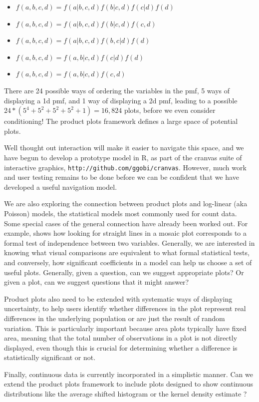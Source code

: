 \documentclass[journal]{vgtc}
\begin{document}
\begin{itemize}
  \setlength{\itemsep}{0em}
  
  \item $f(a, b, c, d) = f(a | b, c, d) f(b | c, d) f(c | d) f(d)$
  \item $f(a, b, c, d) = f(a | b, c, d) f(b | c, d) f(c, d)$
  \item $f(a, b, c, d) = f(a | b, c, d) f(b, c | d) f(d)$
  \item $f(a, b, c, d) = f(a, b | c, d) f(c | d) f(d)$
  \item $f(a, b, c, d) = f(a, b | c, d) f(c, d)$
\end{itemize}

\noindent There are 24 possible ways of ordering the variables in the {\sc pmf}, 5 ways of displaying a 1d {\sc pmf}, and 1 way of displaying a 2d {\sc pmf}, leading to a possible $24 * (5^4 + 5^2 + 5^2 + 5^2 + 1) = 16,824$ plots, before we even consider conditioning! The product plots framework defines a large space of potential plots.

Well thought out interaction will make it easier to navigate this space, and we have begun to develop a prototype model in R, as part of the cranvas suite of interactive graphics, {\tt http://github.com/ggobi/cranvas}.  However, much work and user testing remains to be done before we can be confident that we have developed a useful navigation model.

We are also exploring the connection between product plots and log-linear (aka Poisson) models, the statistical models most commonly used for count data. Some special cases of the general connection have already been worked out. For example, \citep{hofmann:2003} shows how looking for straight lines in a mosaic plot corresponds to a formal test of independence between two variables. Generally, we are interested in knowing what visual comparisons are equivalent to what formal statistical tests, and conversely, how significant coefficients in a model can help us choose a set of useful plots. Generally, given a question, can we suggest appropriate plots? Or given a plot, can we suggest questions that it might answer?

Product plots also need to be extended with systematic ways of displaying uncertainty, to help users identify whether differences in the plot represent real differences in the underlying population or are just the result of random variation. This is particularly important because area plots typically have fixed area, meaning that the total number of observations in a plot is not directly displayed, even though this is crucial for determining whether a difference is statistically significant or not.

Finally, continuous data is currently incorporated in a simplistic manner. Can we extend the product plots framework to include plots designed to show continuous distributions like the average shifted histogram \citep{scott:1985} or the kernel density estimate \citep{scott:1992}?




\end{document}
